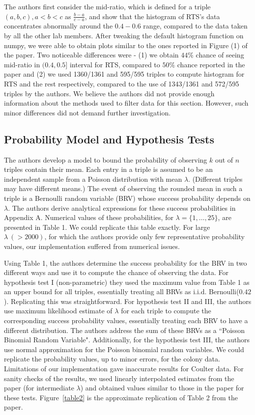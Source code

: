 \documentclass{article}
\begin{document}
The authors first consider the mid-ratio, which is defined for a triple \((a, b, c), a<b<c\) as
\(\frac{b-a}{c-a}\), and show that the histogram of RTS's data concentrates
abnormally around the \(0.4-0.6\) range, compared to the data taken by all the other lab members.
After tweaking the default histogram function on numpy, we were able to obtain plots similar to the ones reported in Figure (1) of the paper. Two noticeable differences were - (1) we obtain $44\%$ chance of seeing mid-ratio in $(0.4, 0.5]$ interval for RTS, compared to $50\%$ chance reported in the paper and (2) we used 1360/1361 and 595/595 triples to compute histogram for RTS and the rest respectively, compared to the use of 1343/1361 and 572/595 triples by the authors.
We believe the authors did not provide enough information about the methods used to filter data for this section. However, such minor differences did not demand further investigation.

    \subsection{Probability Model and Hypothesis Tests}\label{probability-model}

The authors develop a model to bound the probability of observing $k$ out of $n$ triples contain their mean.
Each entry in a triple is assumed to be an independent sample from a Poisson distribution with mean $\lambda$. (Different triples may have different means.)
The event of observing the rounded mean in such a triple is a Bernoulli random variable (BRV) whose success probability depends on $\lambda$.
The authors derive analytical expressions for these success probabilities in Appendix A.
Numerical values of these probabilities, for $\lambda=\{1, \ldots, 25\}$, are presented in Table 1.
We could replicate this table exactly.
For large $\lambda\ (>2000)$, for which the authors provide only few representative probability values, our implementation suffered from numerical issues.

Using Table 1, the authors determine the success probability for the BRV in two different ways and use it to compute the chance of observing the data.  For hypothesis test I (non-parametric) they used the maximum value from Table 1 as an upper bound for all triples, essentially treating all BRVs as i.i.d. Bernoulli($0.42$). Replicating this was straightforward.
For hypothesis test II and III, the authors use maximum likelihood estimate of $\lambda$ for each triple to compute the corresponding success probability values, essentially treating each BRV to have a different distribution. The authors address the sum of these BRVs as a ``Poisson Binomial Random Variable".
Additionally, for the hypothesis test III, the authors use normal approximation for the Poisson binomial random variables. 
We could replicate the probability values, up to minor errors, for the colony data. 
Limitations of our implementation gave inaccurate results for Coulter data. 
For sanity checks of the results, we used linearly interpolated estimates from the paper (for intermediate $\lambda$) and obtained values similar to those in the paper for these tests. Figure~\ref{table2} is the approximate replication of Table 2 from the paper.
\end{document}
